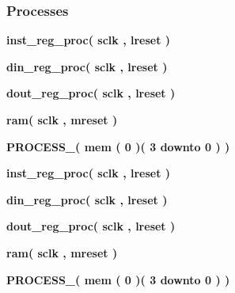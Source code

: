 \subsubsection*{Processes}
 \begin{DoxyCompactItemize}
\item 
{\bf inst\+\_\+reg\+\_\+proc}{\bfseries  ( {\bfseries {\bfseries {\bf sclk}} \textcolor{vhdlchar}{ }} , {\bfseries {\bfseries {\bf lreset}} \textcolor{vhdlchar}{ }} )}
\item 
{\bf din\+\_\+reg\+\_\+proc}{\bfseries  ( {\bfseries {\bfseries {\bf sclk}} \textcolor{vhdlchar}{ }} , {\bfseries {\bfseries {\bf lreset}} \textcolor{vhdlchar}{ }} )}
\item 
{\bf dout\+\_\+reg\+\_\+proc}{\bfseries  ( {\bfseries {\bfseries {\bf sclk}} \textcolor{vhdlchar}{ }} , {\bfseries {\bfseries {\bf lreset}} \textcolor{vhdlchar}{ }} )}
\item 
{\bf ram}{\bfseries  ( {\bfseries {\bfseries {\bf sclk}} \textcolor{vhdlchar}{ }} , {\bfseries {\bfseries {\bf mreset}} \textcolor{vhdlchar}{ }} )}
\item 
{\bf P\+R\+O\+C\+E\+S\+S\+\_}{\bfseries  ( {\bfseries {\bfseries {\bf mem}} \textcolor{vhdlchar}{(}\textcolor{vhdlchar}{ } \textcolor{vhdldigit}{0} \textcolor{vhdlchar}{)}\textcolor{vhdlchar}{(}\textcolor{vhdlchar}{ } \textcolor{vhdldigit}{3} \textcolor{vhdlchar}{ }\textcolor{keywordflow}{downto}\textcolor{vhdlchar}{ }\textcolor{vhdlchar}{ } \textcolor{vhdldigit}{0} \textcolor{vhdlchar}{)}\textcolor{vhdlchar}{ }} )}
\item 
{\bf inst\+\_\+reg\+\_\+proc}{\bfseries  ( {\bfseries {\bfseries {\bf sclk}} \textcolor{vhdlchar}{ }} , {\bfseries {\bfseries {\bf lreset}} \textcolor{vhdlchar}{ }} )}
\item 
{\bf din\+\_\+reg\+\_\+proc}{\bfseries  ( {\bfseries {\bfseries {\bf sclk}} \textcolor{vhdlchar}{ }} , {\bfseries {\bfseries {\bf lreset}} \textcolor{vhdlchar}{ }} )}
\item 
{\bf dout\+\_\+reg\+\_\+proc}{\bfseries  ( {\bfseries {\bfseries {\bf sclk}} \textcolor{vhdlchar}{ }} , {\bfseries {\bfseries {\bf lreset}} \textcolor{vhdlchar}{ }} )}
\item 
{\bf ram}{\bfseries  ( {\bfseries {\bfseries {\bf sclk}} \textcolor{vhdlchar}{ }} , {\bfseries {\bfseries {\bf mreset}} \textcolor{vhdlchar}{ }} )}
\item 
{\bf P\+R\+O\+C\+E\+S\+S\+\_}{\bfseries  ( {\bfseries {\bfseries {\bf mem}} \textcolor{vhdlchar}{(}\textcolor{vhdlchar}{ } \textcolor{vhdldigit}{0} \textcolor{vhdlchar}{)}\textcolor{vhdlchar}{(}\textcolor{vhdlchar}{ } \textcolor{vhdldigit}{3} \textcolor{vhdlchar}{ }\textcolor{keywordflow}{downto}\textcolor{vhdlchar}{ }\textcolor{vhdlchar}{ } \textcolor{vhdldigit}{0} \textcolor{vhdlchar}{)}\textcolor{vhdlchar}{ }} )}
\end{DoxyCompactItemize}
